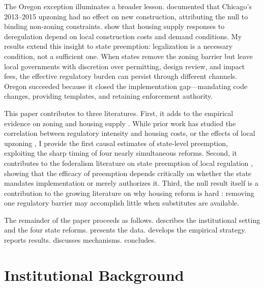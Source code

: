 \documentclass[12pt]{article}
\begin{document}
The Oregon exception illuminates a broader lesson. \citet{freemark2020} documented that Chicago's 2013--2015 upzoning had no effect on new construction, attributing the null to binding non-zoning constraints. \citet{kulka2024} show that housing supply responses to deregulation depend on local construction costs and demand conditions. My results extend this insight to state preemption: legalization is a necessary condition, not a sufficient one. When states remove the zoning barrier but leave local governments with discretion over permitting, design review, and impact fees, the effective regulatory burden can persist through different channels. Oregon succeeded because it closed the implementation gap---mandating code changes, providing templates, and retaining enforcement authority.

This paper contributes to three literatures. First, it adds to the empirical evidence on zoning and housing supply \citep{saiz2010, glaesergyourko2003, turner2014, shertzer2018}. While prior work has studied the correlation between regulatory intensity and housing costs, or the effects of local upzoning \citep{freemark2020}, I provide the first causal estimates of state-level preemption, exploiting the sharp timing of four nearly simultaneous reforms. Second, it contributes to the federalism literature on state preemption of local regulation \citep{mangin2014}, showing that the efficacy of preemption depends critically on whether the state mandates implementation or merely authorizes it. Third, the null result itself is a contribution to the growing literature on why housing reform is hard \citep{schuetz2022, gyourkorivas2023}: removing one regulatory barrier may accomplish little when substitutes are available.

The remainder of the paper proceeds as follows.  describes the institutional setting and the four state reforms.  presents the data.  develops the empirical strategy.  reports results.  discusses mechanisms.  concludes.


\section{Institutional Background}
\label{sec:background}
\end{document}
